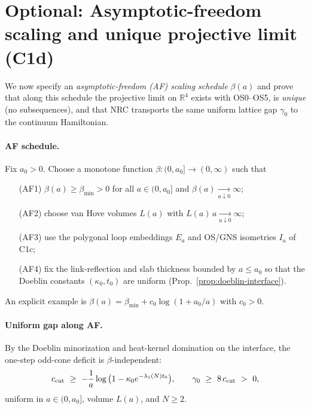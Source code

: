 \documentclass[11pt]{amsart}
\theoremstyle{plain}
\theoremstyle{definition}
\theoremstyle{remark}
\begin{document}
\section{Optional: Asymptotic-freedom scaling and unique projective limit (C1d)}

We now specify an \emph{asymptotic-freedom (AF) scaling schedule} $\beta(a)$ and prove that along this schedule the projective limit on $\mathbb R^4$ exists with OS0--OS5, is \emph{unique} (no subsequences), and that NRC transports the same uniform lattice gap $\gamma_0$ to the continuum Hamiltonian.

\paragraph{AF schedule.}
Fix $a_0>0$. Choose a monotone function $\beta:(0,a_0]\to (0,\infty)$ such that
\begin{itemize}
  \item[(AF1)] $\beta(a)\ge \beta_{\min}>0$ for all $a\in(0,a_0]$ and $\beta(a)\xrightarrow[a\downarrow 0]{}\infty$;
  \item[(AF2)] choose van Hove volumes $L(a)$ with $L(a)\,a\xrightarrow[a\downarrow 0]{}\infty$;
  \item[(AF3)] use the polygonal loop embeddings $E_a$ and OS/GNS isometries $I_a$ of C1c;
  \item[(AF4)] fix the link-reflection and slab thickness bounded by $a\le a_0$ so that the Doeblin constants $(\kappa_0,t_0)$ are uniform (Prop.~\ref{prop:doeblin-interface}).
\end{itemize}
An explicit example is $\beta(a)=\beta_{\min}+c_0\log(1+a_0/a)$ with $c_0>0$.
\paragraph{Uniform gap along AF.}
By the Doeblin minorization and heat-kernel domination on the interface, the one-step odd-cone deficit is $\beta$-independent:
\[
  c_{\rm cut}\ \ge\ -\frac{1}{a}\log\big(1-\kappa_0 e^{-\lambda_1(N) t_0}\big),\qquad
  \gamma_0\ \ge\ 8\,c_{\mathrm{cut}}\ >\ 0,
\]
uniform in $a\in(0,a_0]$, volume $L(a)$, and $N\ge 2$.
\end{document}
